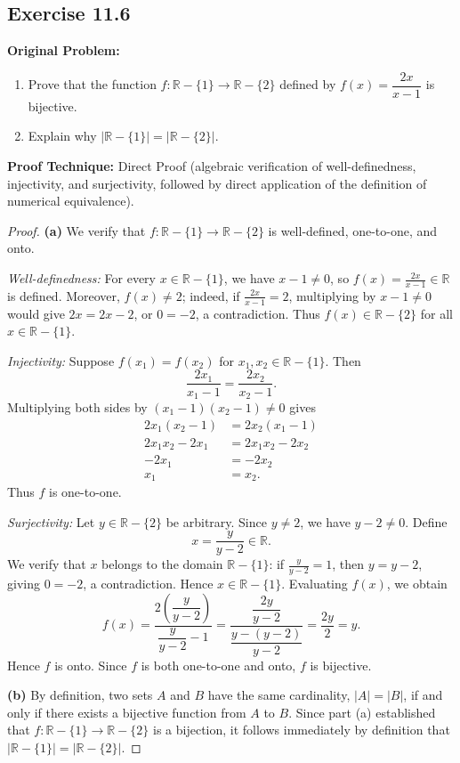 \documentclass[11pt, letterpaper]{article}
\theoremstyle{definition}
\theoremstyle{remark}
\begin{document}
\subsection{Exercise 11.6}

\textbf{Original Problem:}
\begin{enumerate}[label=(\alph*)]
    \item Prove that the function $f : \mathbb{R} - \{1\} \to \mathbb{R} - \{2\}$ defined by $f(x) = \dfrac{2x}{x - 1}$ is bijective.
    \item Explain why $|\mathbb{R} - \{1\}| = |\mathbb{R} - \{2\}|$.
\end{enumerate}

\textbf{Proof Technique:} Direct Proof (algebraic verification of well-definedness, injectivity, and surjectivity, followed by direct application of the definition of numerical equivalence).

\begin{proof}
\textbf{(a)} We verify that $f : \mathbb{R} - \{1\} \to \mathbb{R} - \{2\}$ is well-defined, one-to-one, and onto.

\emph{Well-definedness:} For every $x \in \mathbb{R} - \{1\}$, we have $x - 1 \neq 0$, so $f(x) = \frac{2x}{x-1} \in \mathbb{R}$ is defined. Moreover, $f(x) \neq 2$; indeed, if $\frac{2x}{x-1} = 2$, multiplying by $x - 1 \neq 0$ would give $2x = 2x - 2$, or $0 = -2$, a contradiction. Thus $f(x) \in \mathbb{R} - \{2\}$ for all $x \in \mathbb{R} - \{1\}$.

\emph{Injectivity:} Suppose $f(x_1) = f(x_2)$ for $x_1, x_2 \in \mathbb{R} - \{1\}$. Then
\[
\frac{2x_1}{x_1 - 1} = \frac{2x_2}{x_2 - 1}.
\]
Multiplying both sides by $(x_1 - 1)(x_2 - 1) \neq 0$ gives
\begin{align*}
2x_1(x_2 - 1) &= 2x_2(x_1 - 1) \\
2x_1 x_2 - 2x_1 &= 2x_1 x_2 - 2x_2 \\
-2x_1 &= -2x_2 \\
x_1 &= x_2.
\end{align*}
Thus $f$ is one-to-one.

\emph{Surjectivity:} Let $y \in \mathbb{R} - \{2\}$ be arbitrary. Since $y \neq 2$, we have $y - 2 \neq 0$. Define
\[
x = \frac{y}{y - 2} \in \mathbb{R}.
\]
We verify that $x$ belongs to the domain $\mathbb{R} - \{1\}$: if $\frac{y}{y-2} = 1$, then $y = y - 2$, giving $0 = -2$, a contradiction. Hence $x \in \mathbb{R} - \{1\}$. Evaluating $f(x)$, we obtain
\[
f(x) = \frac{2\left(\dfrac{y}{y - 2}\right)}{\dfrac{y}{y - 2} - 1} = \frac{\dfrac{2y}{y - 2}}{\dfrac{y - (y - 2)}{y - 2}} = \frac{2y}{2} = y.
\]
Hence $f$ is onto. Since $f$ is both one-to-one and onto, $f$ is bijective.

\textbf{(b)} By definition, two sets $A$ and $B$ have the same cardinality, $|A| = |B|$, if and only if there exists a bijective function from $A$ to $B$. Since part (a) established that $f : \mathbb{R} - \{1\} \to \mathbb{R} - \{2\}$ is a bijection, it follows immediately by definition that $|\mathbb{R} - \{1\}| = |\mathbb{R} - \{2\}|$.
\end{proof}
\end{document}
